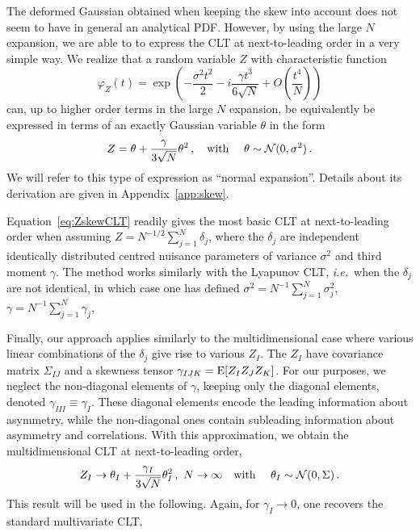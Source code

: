 \documentclass[11pt]{article}
\def\ie{{\it i.e.}}
\newcommand{\be}{\begin{equation}}
\newcommand{\ee}{\end{equation}}
\begin{document}
The deformed Gaussian obtained when keeping the skew into account does not seem to have in general an analytical PDF. However, by using the large $N$ expansion, we are able to  to express the CLT at next-to-leading order in a very simple way. 
We realize that a random variable $Z$ with characteristic function
\be
\varphi_Z(t)=\exp\left(-\frac{\sigma^2 t^2}{2}-i \frac{\gamma t^3}{6 \sqrt{N}} +O\left(\frac{t^4}{N}\right)\right) \label{eq:CF_CLT}
 \ee
can, up to higher order terms in the large $N$ expansion, be equivalently be expressed in terms of an exactly Gaussian variable $\theta$ in the form
\be
Z= \theta+\frac{\gamma}{3\sqrt{N}}\theta^2\,,  \quad \textrm{with } \quad \theta\sim{\cal N}(0,\sigma^2)\,. \label{eq:ZskewCLT}
\ee
We will refer to this type of expression as ``normal expansion''. Details about its derivation are given in Appendix~\ref{app:skew}.


Equation~\eqref{eq:ZskewCLT}  readily gives the most basic CLT at next-to-leading order when assuming $Z=N^{-1/2}\sum_{j=1}^N \delta_j$, where the $\delta_j$ are  independent identically distributed centred nuisance parameters  of variance $\sigma^2$ and third moment $\gamma$. The method works similarly with the Lyapunov CLT, \ie\ when the $\delta_j$ are not identical, in which case one has defined $\sigma^2=N^{-1}\sum_{j=1}^N \sigma_j^2$, $\gamma=N^{-1}\sum_{j=1}^N \gamma_j$,

Finally, our approach applies similarly to the multidimensional case where various linear combinations of the $\delta_j$ give rise to various $Z_I$. The $Z_I$ have covariance matrix $\Sigma_{IJ}$ and a skewness tensor $\gamma_{IJK}={\rm E}[Z_IZ_JZ_K]$. For our purposes, we neglect the non-diagonal elements of $\gamma$, keeping only  the diagonal elements, denoted $\gamma_{III}\equiv \gamma_I$. These diagonal elements encode the leading information about asymmetry, while the non-diagonal ones contain subleading information about asymmetry and correlations. With this approximation, we obtain the multidimensional CLT at next-to-leading order,
\be
Z_I\rightarrow \theta_I+\frac{\gamma_{I}}{3\sqrt{N}}\theta_I^2\,,\,\,N\rightarrow \infty  \quad \textrm{with } \quad \theta_I\sim{\cal N}(0,\Sigma)\,. \label{eq:NLCFT}
\ee
 This  result will be used in the following. Again, for $\gamma_I\rightarrow 0$, one recovers the standard multivariate CLT.
\end{document}
